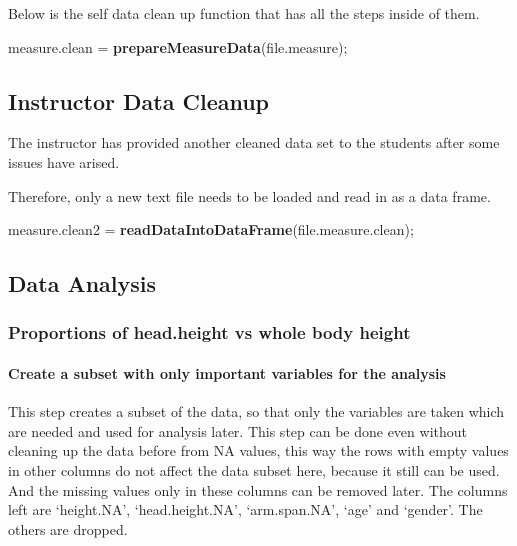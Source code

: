 \documentclass[]{article}
\newenvironment{Shaded}{\begin{snugshade}}{\end{snugshade}}
\newcommand{\KeywordTok}[1]{\textcolor[rgb]{0.13,0.29,0.53}{\textbf{#1}}}
\newcommand{\NormalTok}[1]{#1}
\newcommand{\StringTok}[1]{\textcolor[rgb]{0.31,0.60,0.02}{#1}}
\begin{document}
Below is the self data clean up function that has all the steps inside
of them.

\begin{Shaded}
\begin{Highlighting}[]
\NormalTok{measure.clean =}\StringTok{ }\KeywordTok{prepareMeasureData}\NormalTok{(file.measure);}
\end{Highlighting}
\end{Shaded}

\newpage

\subsection{Instructor Data Cleanup}
\label{sec:appendix-instructor-data-cleanup}

The instructor has provided another cleaned data set to the students
after some issues have arised.

Therefore, only a new text file needs to be loaded and read in as a data
frame.

\begin{Shaded}
\begin{Highlighting}[]
\NormalTok{measure.clean2 =}\StringTok{ }\KeywordTok{readDataIntoDataFrame}\NormalTok{(file.measure.clean);}
\end{Highlighting}
\end{Shaded}

\newpage

\subsection{Data Analysis}
\label{sec:appendix-data-analysis}

\subsubsection{Proportions of head.height vs whole body height}
\label{sec:appendix-height-vs-head.height}

\paragraph{Create a subset with only important variables for the analysis}
\label{sec:appendix-create-subset}

This step creates a subset of the data, so that only the variables are
taken which are needed and used for analysis later. This step can be
done even without cleaning up the data before from NA values, this way
the rows with empty values in other columns do not affect the data
subset here, because it still can be used. And the missing values only
in these columns can be removed later. The columns left are `height.NA',
`head.height.NA', `arm.span.NA', `age' and `gender'. The others are
dropped.
\end{document}
